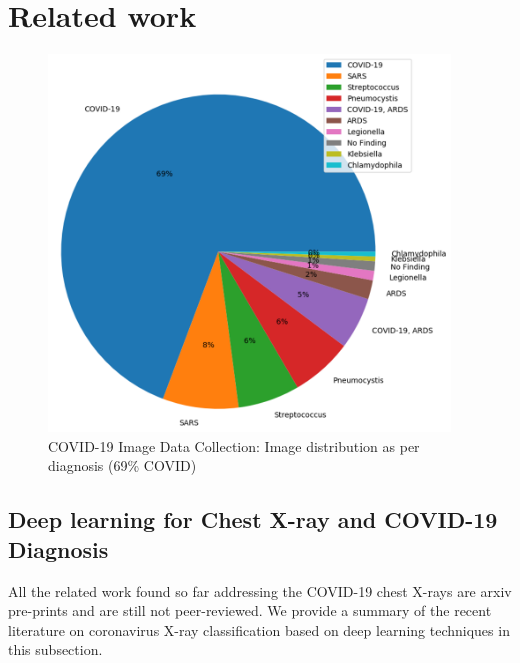 \section{Related work}
\label{sec:background}
 \begin{figure}
\centering
\includegraphics[width=0.95\textwidth]{images/Finding_PA_Figure_1.png}
   \caption{COVID-19 Image Data Collection: Image distribution as per diagnosis (69\% COVID) }
\label{fig:data_dist}

\end{figure}
\subsection{Deep learning for Chest X-ray and COVID-19 Diagnosis}

All the related work found so far addressing the COVID-19 chest X-rays are arxiv pre-prints  and are still not peer-reviewed. We provide a summary of the recent literature on coronavirus X-ray classification based on deep learning techniques in this subsection. 


